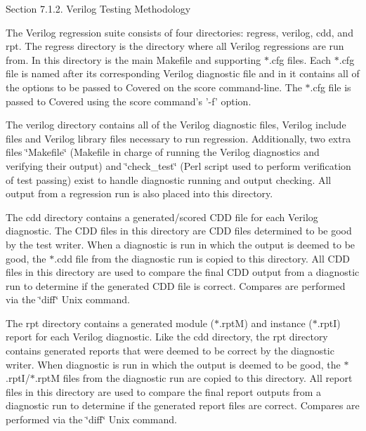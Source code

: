 \begin{Desc}
\item[Section 7.1.2. Verilog Testing Methodology]\end{Desc}
\begin{Desc}
\item[]The Verilog regression suite consists of four directories: regress, verilog, cdd, and rpt. The regress directory is the directory where all Verilog regressions are run from. In this directory is the main Makefile and supporting $\ast$.cfg files. Each $\ast$.cfg file is named after its corresponding Verilog diagnostic file and in it contains all of the options to be passed to Covered on the score command-line. The $\ast$.cfg file is passed to Covered using the score command's '-f' option.\end{Desc}
\begin{Desc}
\item[]The verilog directory contains all of the Verilog diagnostic files, Verilog include files and Verilog library files necessary to run regression. Additionally, two extra files \char`\"{}Makefile\char`\"{} (Makefile in charge of running the Verilog diagnostics and verifying their output) and \char`\"{}check\_\-test\char`\"{} (Perl script used to perform verification of test passing) exist to handle diagnostic running and output checking. All output from a regression run is also placed into this directory.\end{Desc}
\begin{Desc}
\item[]The cdd directory contains a generated/scored CDD file for each Verilog diagnostic. The CDD files in this directory are CDD files determined to be good by the test writer. When a diagnostic is run in which the output is deemed to be good, the $\ast$.cdd file from the diagnostic run is copied to this directory. All CDD files in this directory are used to compare the final CDD output from a diagnostic run to determine if the generated CDD file is correct. Compares are performed via the \char`\"{}diff\char`\"{} Unix command.\end{Desc}
\begin{Desc}
\item[]The rpt directory contains a generated module ($\ast$.rpt\-M) and instance ($\ast$.rpt\-I) report for each Verilog diagnostic. Like the cdd directory, the rpt directory contains generated reports that were deemed to be correct by the diagnostic writer. When diagnostic is run in which the output is deemed to be good, the $\ast$.rpt\-I/$\ast$.rpt\-M files from the diagnostic run are copied to this directory. All report files in this directory are used to compare the final report outputs from a diagnostic run to determine if the generated report files are correct. Compares are performed via the \char`\"{}diff\char`\"{} Unix command.\end{Desc}
